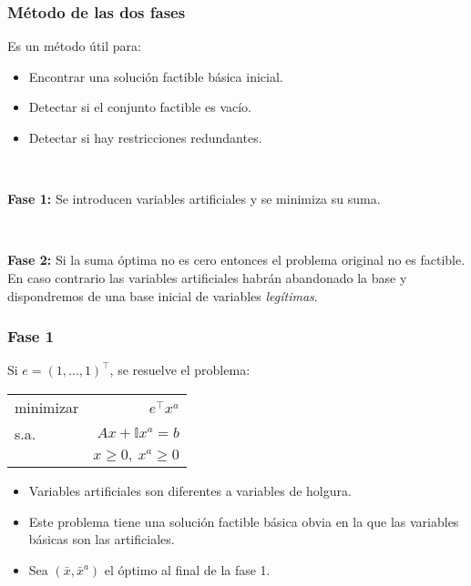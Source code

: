 \documentclass{beamer}
\begin{document}
\begin{frame}
\frametitle{Método de las dos fases}

Es un método útil para:

\begin{itemize}
\item Encontrar una solución factible básica inicial.

\item Detectar si el conjunto factible es  vacío.

\item Detectar si hay restricciones redundantes.
\end{itemize}


\


\textbf{Fase 1:} Se introducen variables artificiales y se minimiza su suma.

\

\textbf{Fase 2:} Si la suma óptima no es cero entonces el problema original no es factible. En caso contrario las variables artificiales habrán abandonado la base y dispondremos de una base inicial de variables \textit{legítimas}.

\end{frame}
\begin{frame}
\frametitle{Fase 1}

Si $e=(1,\ldots,1)^\top$, se resuelve el problema:

\begin{center}
\begin{tabular}{lr}
minimizar & $e^\top x^a$ \\
s.a. & $Ax + \mathbb{I}x^a = b$   \\
	 & $x\geq 0,\ x^a\geq 0$
\end{tabular}
\end{center}


\begin{itemize}
\item Variables artificiales son diferentes a variables de holgura.
\item Este problema tiene una solución factible básica obvia en la que las variables básicas son las artificiales.
\item Sea $(\bar{x},\bar{x}^a)$ el óptimo al final de la fase 1.
\end{itemize}

\end{frame}
\end{document}
